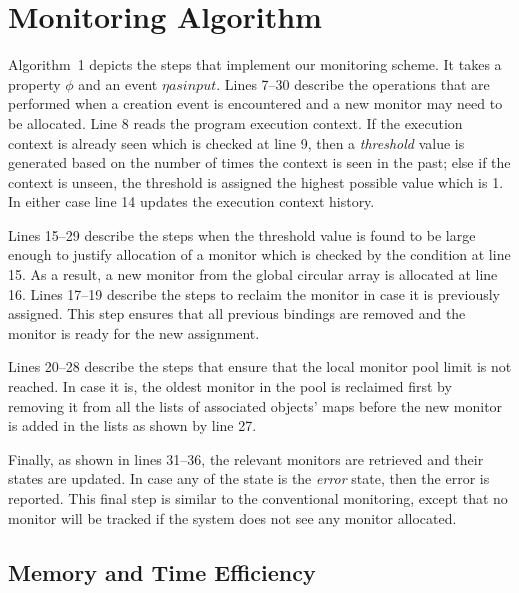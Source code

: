 \section{Monitoring Algorithm}
\label{sec:algo}

Algorithm~1 depicts the steps that implement our monitoring scheme. It takes a
property $\phi$ and an event $\eta as input. $ Lines 7--30 
describe the operations that are performed when a creation event is encountered 
and a new monitor may need to be allocated. Line 8 reads the program execution 
context. If the execution context is already seen which is checked at line 9, 
then a \textit{threshold} value is generated based on the number of times the 
context is seen in the past; else if the context is unseen, the threshold is 
assigned the highest possible value which is 1. In either case line 14 updates 
the execution context history.

Lines 15--29 describe the steps when the threshold value is found to be large 
enough to justify allocation of a monitor which is checked by the condition at 
line 15. As a result, a new monitor from the global circular array is allocated
at line 16. Lines 17--19 describe the steps to reclaim the monitor in case it is previously 
assigned. This step ensures that all previous bindings are removed and the 
monitor is ready for the new assignment.

Lines 20--28 describe the steps that ensure that the local monitor pool limit is 
not reached. In case it is, the oldest monitor in the pool is reclaimed first by 
removing it from all the lists of associated objects' maps before the new monitor 
is added in the lists as shown by line 27.

Finally, as shown in lines 31--36, the relevant monitors are retrieved and their 
states are updated. In case any of the state is the \textit{error} state, then 
the error is reported. This final step is similar to the conventional 
monitoring, except that no monitor will be tracked if the system does not see 
any monitor allocated.

\subsection{Memory and Time Efficiency }
\label{subsec:memory efficiency}

